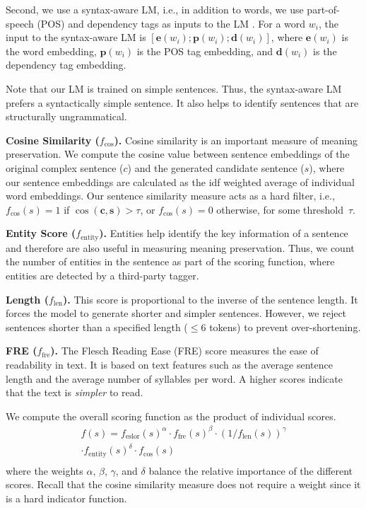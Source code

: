 \documentclass[11pt,a4paper]{article}
\begin{document}
Second, we use a syntax-aware LM, i.e., in addition to words, we use part-of-speech (POS) and dependency tags as inputs to the LM \cite{zhao2018language}. For a word $w_i$, the input to the syntax-aware LM is $[\bm e(w_i);\bm p(w_i);\bm d(w_i)]$, where $\bm e(w_i)$ is the word embedding, $\bm p(w_i)$ is the POS tag embedding, and $\bm d(w_i)$ is the dependency tag embedding.

Note that our LM is trained on simple sentences. Thus, the syntax-aware LM prefers a syntactically simple sentence. It also helps to identify sentences that are structurally ungrammatical. 

 
\textbf{Cosine Similarity (}$f_{\cos}$\textbf{).} Cosine similarity is an important measure of meaning preservation. We compute the cosine value between sentence embeddings of the original complex sentence ($c$) and the generated candidate sentence ($s$), where our sentence embeddings are calculated as the idf weighted average of individual word embeddings. Our sentence similarity measure acts as a hard filter, i.e., $f_\text{cos}(s)=1$ if $\cos(\bm c,\bm s)>\tau$, or $f_\text{cos}(s)=0$ otherwise, for some threshold~$\tau$.

\textbf{Entity Score (}$f_{\operatorname{entity}}$\textbf{).} Entities help identify the key information of a sentence and therefore are also useful in measuring {meaning preservation}. Thus, we count the number of entities in the sentence as part of the scoring function, where entities are detected by a third-party tagger.

\textbf{Length (}$f_{\operatorname{len}}$\textbf{).}  This score is proportional to the inverse of the sentence length. It forces the model to generate {shorter} and {simpler} sentences. However, we reject sentences shorter than a specified length ($\le$6 tokens) to prevent over-shortening.

\textbf{FRE (}$f_{\operatorname{fre}}$\textbf{).} The Flesch Reading Ease (FRE) score \cite{kincaid1975derivation} measures the ease of readability in text. It is based on text features such as the average sentence length and the average number of syllables per word. A higher scores indicate that the text is \textit{simpler} to read.

\smallskip
We compute the overall scoring function as the product of individual scores.
\begin{equation}
\begin{split}
        {f}(s) = f_\mathrm{{eslor}}(s)^\alpha \cdot f_\mathrm{{fre}}(s)^\beta \cdot (1/f_\mathrm{{len}}(s))^\gamma \\ 
         \cdot f_\mathrm{{entity}}(s)^\delta \cdot f_\mathrm{{cos}}(s)  \\
\end{split}
\end{equation}
where the weights $\alpha$, $\beta$, $\gamma$, and $\delta$ balance the relative importance of the different scores. Recall that the cosine similarity measure does not require a weight since it is a hard indicator function.
\end{document}
